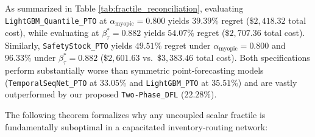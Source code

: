 \documentclass[11pt,a4paper]{article}
\theoremstyle{definition}
\theoremstyle{remark}
\begin{document}
\begin{itemize}[leftmargin=*]
    As summarized in Table \ref{tab:fractile_reconciliation}, evaluating \texttt{LightGBM\_Quantile\_PTO} at $\alpha_{\text{myopic}} = 0.800$ yields $39.39\%$ regret ($\$2,418.32$ total cost), while evaluating at $\beta_\tau^* = 0.882$ yields $54.07\%$ regret ($\$2,707.36$ total cost). Similarly, \texttt{SafetyStock\_PTO} yields $49.51\%$ regret under $\alpha_{\text{myopic}} = 0.800$ and $96.33\%$ under $\beta_\tau^* = 0.882$ ($\$2,601.63$ vs.\ $\$3,383.46$ total cost). Both specifications perform substantially worse than symmetric point-forecasting models (\texttt{TemporalSeqNet\_PTO} at $33.05\%$ and \texttt{LightGBM\_PTO} at $35.51\%$) and are vastly outperformed by our proposed \texttt{Two-Phase\_DFL} ($22.28\%$). 

    The following theorem formalizes why any uncoupled scalar fractile is fundamentally suboptimal in a capacitated inventory-routing network:


\end{itemize}
\end{document}
